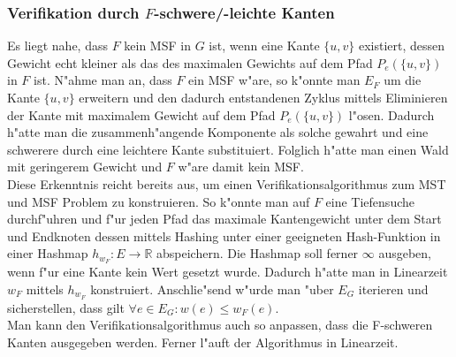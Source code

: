 \subsubsection{Verifikation durch $F$-schwere/-leichte Kanten}
\label{sec:verification}
Es liegt nahe, dass $F$ kein MSF in $G$ ist, wenn eine Kante $\{u,v\}$ 
    existiert, dessen Gewicht echt kleiner als das des maximalen Gewichts auf dem
    Pfad $P_e(\{u,v\})$ in $F$ ist. 
    N"ahme man an, dass $F$ ein MSF w"are, 
    so k"onnte man $E_F$ um die Kante $\{u,v\}$ erweitern und den dadurch 
    entstandenen Zyklus mittels Eliminieren der Kante mit maximalem Gewicht auf dem
    Pfad $P_e(\{u,v\})$ l"osen. Dadurch h"atte man die zusammenh"angende 
    Komponente als solche gewahrt und eine schwerere durch eine leichtere Kante
    substituiert. Folglich h"atte man einen Wald mit geringerem Gewicht
    und $F$ w"are damit kein MSF.\\
Diese Erkenntnis reicht bereits aus, um einen Verifikationsalgorithmus zum 
    MST und MSF Problem zu konstruieren.
    So k"onnte man auf $F$ eine Tiefensuche durchf"uhren und f"ur jeden Pfad 
    das maximale Kantengewicht unter dem Start und Endknoten dessen mittels
    Hashing unter einer geeigneten Hash-Funktion in einer Hashmap 
    $h_{w_F} : E \rightarrow \mathbb{R}$ abspeichern. 
    Die Hashmap soll ferner $\infty$ ausgeben, wenn f"ur eine Kante kein Wert 
    gesetzt wurde.
    Dadurch h"atte man in Linearzeit $w_F$ mittels $h_{w_F}$ konstruiert.
    Anschlie"send w"urde man "uber $E_G$ iterieren und sicherstellen, dass gilt
    $\forall e \in E_G: w(e) \leq w_F(e)$.\\
Man kann den Verifikationsalgorithmus auch so anpassen, dass die F-schweren Kanten
    ausgegeben werden.
    Ferner l"auft der Algorithmus in Linearzeit.\\
